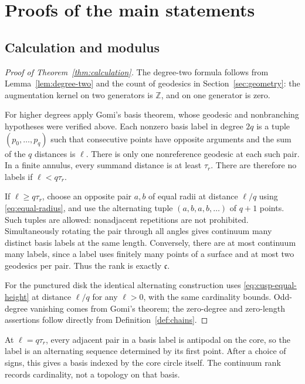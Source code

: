 \documentclass[12pt]{amsart}
\theoremstyle{definition}
\theoremstyle{remark}
\numberwithin{equation}{section}
\newcommand{\Z}{\mathbb{Z}}
\begin{document}
\section{Proofs of the main statements}\label{sec:proofs}
\subsection{Calculation and modulus}
\begin{proof}[Proof of Theorem~\ref{thm:calculation}]
The degree-two formula follows from Lemma~\ref{lem:degree-two} and the count of geodesics in Section~\ref{sec:geometry}: the augmentation kernel on two generators is $\Z$, and on one generator is zero.

For higher degrees apply Gomi's basis theorem, whose geodesic and nonbranching hypotheses were verified above. Each nonzero basis label in degree $2q$ is a tuple $(p_0,\ldots,p_q)$ such that consecutive points have opposite arguments and the sum of the $q$ distances is $\ell$. There is only one nonreference geodesic at each such pair. In a finite annulus, every summand distance is at least $\tau_r$. There are therefore no labels if $\ell<q\tau_r$.

If $\ell\ge q\tau_r$, choose an opposite pair $a,b$ of equal radii at distance $\ell/q$ using \eqref{eq:equal-radius}, and use the alternating tuple $(a,b,a,b,\ldots)$ of $q+1$ points. Such tuples are allowed: nonadjacent repetitions are not prohibited. Simultaneously rotating the pair through all angles gives continuum many distinct basis labels at the same length. Conversely, there are at most continuum many labels, since a label uses finitely many points of a surface and at most two geodesics per pair. Thus the rank is exactly $\mathfrak c$.

For the punctured disk the identical alternating construction uses \eqref{eq:cusp-equal-height} at distance $\ell/q$ for any $\ell>0$, with the same cardinality bounds. Odd-degree vanishing comes from Gomi's theorem; the zero-degree and zero-length assertions follow directly from Definition~\ref{def:chains}.
\end{proof}
At $\ell=q\tau_r$, every adjacent pair in a basis label is antipodal on the core, so the label is an alternating sequence determined by its first point. After a choice of signs, this gives a basis indexed by the core circle itself. The continuum rank records cardinality, not a topology on that basis.
\end{document}

